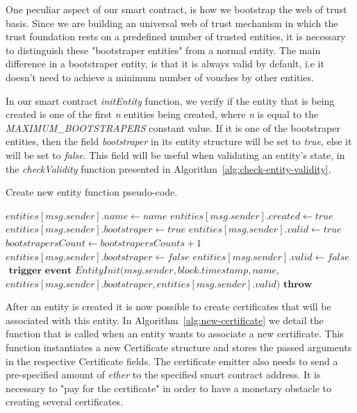One peculiar aspect of our smart contract, is how we bootstrap the web of trust basis.
Since we are building an universal web of trust mechanism in which the trust foundation rests on a predefined number of trusted entities, it is necessary to distinguish these "bootstraper entities" from a normal entity.
The main difference in a bootstraper entity, is that it is always valid by default, i.e it doesn't need to achieve a minimum number of vouches by other entities.

In our smart contract \textit{initEntity} function, we verify if the entity that is being created is one of the first \textit{n} entities being created, where \textit{n} is equal to the \textit{MAXIMUM\_BOOTSTRAPERS} constant value.
If it is one of the bootstraper entities, then the field \textit{bootstraper} in its entity structure will be set to \textit{true}, else it will be set to \textit{false}.
This field will be useful when validating an entity's state, in the \textit{checkValidity} function presented in Algorithm~\ref{alg:check-entity-validity}.

\begin{algorithm}[h!]
  \caption{Create new entity function pseudo-code.}
  \label{alg:create-entity}
  \begin{algorithmic}[1]
        \State $entities[msg.sender].name \gets name$
        \State $entities[msg.sender].created \gets true$
        \State
          \State $entities[msg.sender].bootstraper \gets  true$
          \State $entities[msg.sender].valid \gets true$
          \State $bootstrapersCount \gets bootstrapersCounts + 1$
        \Else
          \State $entities[msg.sender].bootstraper \gets  false$
          \State $entities[msg.sender].valid \gets false$
        \EndIf
          \State
          \State $\textbf{ trigger event } EntityInit(msg.sender, block.timestamp, name,$
          \State $entities[msg.sender].bootstraper, entities[msg.sender].valid)$
      \Else
        \State $\textbf{throw}$
      \EndIf
    \EndFunction
  \end{algorithmic}
\end{algorithm}


After an entity is created it is now possible to create certificates that will be associated with this entity.
In Algorithm~\ref{alg:new-certificate} we detail the function that is called when an entity wants to associate a new certificate.
This function instantiates a new Certificate structure and stores the passed arguments in the respective Certificate fields.
The certificate emitter also needs to send a pre-specified amount of \textit{ether} to the specified smart contract address.
It is necessary to "pay for the certificate" in order to have a monetary obstacle to creating several certificates.

